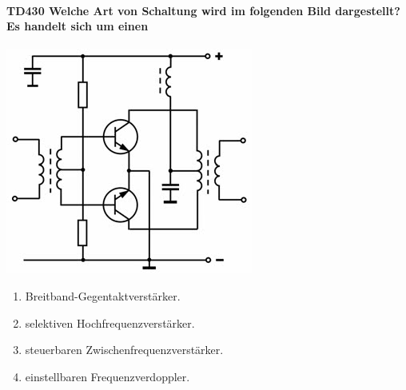 \documentclass[8pt]{article}
\begin{document}
\begin{enumerate}
\begin{enumerate}[nolistsep,label=\Alph*]
\paragraph*{TD430 Welche Art von Schaltung wird im folgenden Bild dargestellt? Es handelt sich um einen}
\begin{center}
	\begin{minipage}{\linewidth}
		\centering
		\includegraphics[scale=1.0]{pics/td430_a.jpg}
	\end{minipage}
\end{center}
\begin{enumerate}[nolistsep,label=\Alph*]
\item Breitband-Gegentaktverstärker.
\item selektiven Hochfrequenzverstärker.
\item steuerbaren Zwischenfrequenzverstärker.
\item einstellbaren Frequenzverdoppler.
\end{enumerate}


\end{enumerate}
\end{enumerate}
\end{document}
